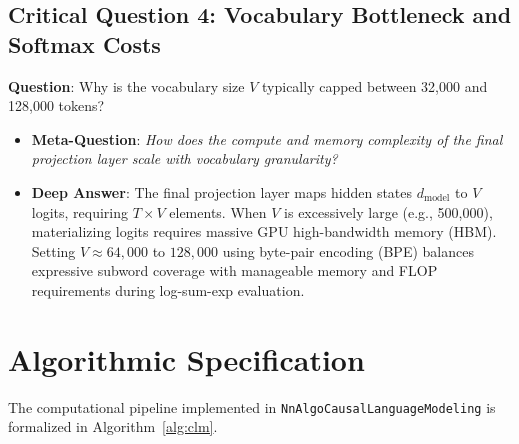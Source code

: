 \documentclass[11pt,a4paper]{article}
\theoremstyle{definition}
\begin{document}
\subsection{\textbf{Critical Question 4: Vocabulary Bottleneck and Softmax Costs}}
\textbf{Question}: Why is the vocabulary size $V$ typically capped between 32,000 and 128,000 tokens?
\begin{itemize}
    \item \textbf{Meta-Question}: \emph{How does the compute and memory complexity of the final projection layer scale with vocabulary granularity?}
    \item \textbf{Deep Answer}: The final projection layer maps hidden states $d_{\text{model}}$ to $V$ logits, requiring $T \times V$ elements. When $V$ is excessively large (e.g., 500,000), materializing logits requires massive GPU high-bandwidth memory (HBM). Setting $V \approx 64,000$ to $128,000$ using byte-pair encoding (BPE) balances expressive subword coverage with manageable memory and FLOP requirements during log-sum-exp evaluation.
\end{itemize}

\section{Algorithmic Specification}

The computational pipeline implemented in \texttt{NnAlgoCausalLanguageModeling} is formalized in Algorithm~\ref{alg:clm}.
\end{document}
